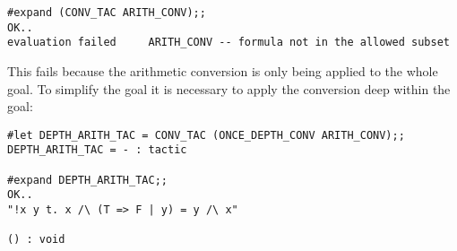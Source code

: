 \begin{session}\begin{verbatim}
#expand (CONV_TAC ARITH_CONV);;
OK..
evaluation failed     ARITH_CONV -- formula not in the allowed subset
\end{verbatim}\end{session}

\noindent
This fails because the arithmetic conversion is only being applied to the
whole goal. To simplify the goal it is necessary to apply the conversion
deep within the goal:

\begin{session}\begin{verbatim}
#let DEPTH_ARITH_TAC = CONV_TAC (ONCE_DEPTH_CONV ARITH_CONV);;
DEPTH_ARITH_TAC = - : tactic

#expand DEPTH_ARITH_TAC;;
OK..
"!x y t. x /\ (T => F | y) = y /\ x"

() : void
\end{verbatim}\end{session}
